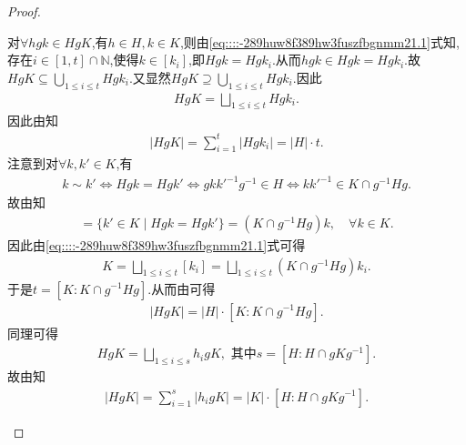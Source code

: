 \documentclass[../../main.tex]{subfiles}%
\begin{document}
\begin{proof}
\begin{enumerate}[(1)]
对$\forall hgk\in HgK$,有$h\in H,k\in K$,则由\eqref{eq::::-289huw8f389hw3fuszfbgnmm21.1}式知,存在$i\in [1,t]\cap \mathbb{N}$,使得$k\in [k_i]$,即$Hgk=Hgk_i$.从而$hgk\in Hgk=Hgk_i$.故$HgK\subseteq \bigcup\limits_{1\leqslant i\leqslant t}Hgk_i$.又显然$HgK\supseteq \bigcup\limits_{1\leqslant i\leqslant t}Hgk_i$.因此
\begin{align*}
HgK=\bigsqcup\limits_{1\leqslant i\leqslant t}Hgk_i.
\end{align*}
因此由知
\begin{align*}
|HgK|=\sum\limits_{i=1}^t|Hgk_i|=|H|\cdot t.
\end{align*}
注意到对$\forall k,k'\in K$,有
\begin{align*}
k\sim k'\Longleftrightarrow Hgk=Hgk'\Longleftrightarrow gkk'^{-1}g^{-1}\in H\Longleftrightarrow kk'^{-1}\in K\cap g^{-1}Hg.
\end{align*}
故由知
\begin{align*}
[k]=\{ k'\in K\mid Hgk=Hgk' \}=(K\cap g^{-1}Hg)k,\quad \forall k\in K.
\end{align*}
因此由\eqref{eq::::-289huw8f389hw3fuszfbgnmm21.1}式可得
\begin{align*}
K=\bigsqcup\limits_{1\leqslant i\leqslant t}[k_i]=\bigsqcup\limits_{1\leqslant i\leqslant t}(K\cap g^{-1}Hg)k_i.
\end{align*}
于是$t=[K:K\cap g^{-1}Hg]$.从而由可得
\begin{align*}
|HgK|=|H|\cdot [K:K\cap g^{-1}Hg].
\end{align*}
同理可得
\begin{align*}
HgK=\bigsqcup\limits_{1\leqslant i\leqslant s}h_igK,\,\,\text{其中}s=[H:H\cap gKg^{-1}].
\end{align*}
故由知
\begin{align*}
|HgK|=\sum_{i=1}^{s}|h_igK|=|K|\cdot[H:H\cap gKg^{-1}].
\end{align*}


\end{enumerate}
\end{proof}
\end{document}
